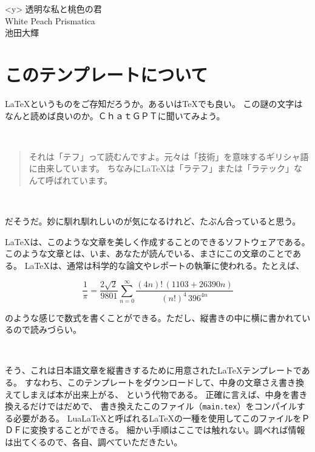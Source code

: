 \documentclass[
  book, tate,           %
  paper=a6,             %
  fontsize=13Q,         %
  jafontsize=13Q,       %
  line_length=39zw,     %
  number_of_lines=16,   %
  gutter=13mm,          %
  foot_space=10mm,      %
  baselineskip=1.6zw,   %
  headfoot_verticalposition=1zw, %
  hanging_punctuation   %
]{jlreq}
\newcommand{\booktitle}{透明な私と桃色の君}      %
\newcommand{\booksubtitle}{White Peach Prismatica} %
\newcommand{\authorname}{池田大輝}                %
\begin{document}
\begin{titlepage}
  \begin{minipage}<y>{\textheight}
    \centering
    \vspace*{0.5\textheight} %
    {\LARGE \booktitle}\\[1em] %
    {\large \booksubtitle}\\[2em] %
    {\normalsize \authorname} %
  \end{minipage}
\end{titlepage}

\chapter*{このテンプレートについて} %

\LaTeX{}というものをご存知だろうか。あるいは\TeX{}でも良い。
この謎の文字はなんと読めば良いのか。ＣｈａｔＧＰＴに聞いてみよう。

\

\begin{quote}
それは「テフ」って読むんですよ。元々は「技術」を意味するギリシャ語に由来しています。
ちなみに\LaTeX{}は「ラテフ」または「ラテック」なんて呼ばれています。
\end{quote}

\

だそうだ。妙に馴れ馴れしいのが気になるけれど、たぶん合っていると思う。

\LaTeX{}は、このような文章を美しく作成することのできるソフトウェアである。
このような文章とは、いま、あなたが読んでいる、まさにこの文章のことである。
\LaTeX{}は、通常は科学的な論文やレポートの執筆に使われる。たとえば、

\[
  \frac{1}{\pi} = \frac{2\sqrt{2}}{9801}
  \sum_{n=0}^{\infty}
    \frac{(4n)! \, (1103 + 26390 n)}{(n!)^{4}\, 396^{4n}}
\]

のような感じで数式を書くことができる。ただし、縦書きの中に横に書かれているので読みづらい。

\

そう、これは日本語文章を縦書きするために用意された\LaTeX{}テンプレートである。
すなわち、このテンプレートをダウンロードして、中身の文章さえ書き換えてしまえば本が出来上がる、
という代物である。
正確に言えば、中身を書き換えるだけではだめで、
書き換えたこのファイル（\texttt{main.tex}）をコンパイルする必要がある。
LuaLaTeXと呼ばれる\LaTeX{}の一種を使用してこのファイルをＰＤＦに変換することができる。
細かい手順はここでは触れない。調べれば情報は出てくるので、各自、調べていただきたい。
\end{document}
